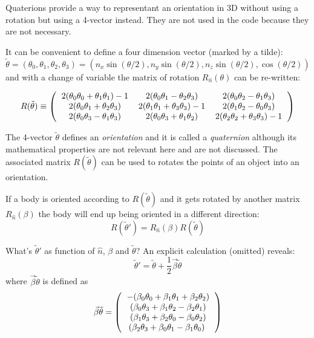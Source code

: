 \documentclass[12pt]{article}
\begin{document}
Quaterions provide a way to representant an orientation in 3D without using a rotation but using a 4-vector instead. They are not used in the code because they are not necessary.

It can be convenient to define a four dimension vector (marked by a tilde):
\begin{equation}
\tilde \theta = (\theta_0,\theta_1,\theta_2,\theta_3) = (n_x \sin(\theta/2), n_y \sin(\theta/2), n_z \sin(\theta/2),\cos(\theta/2))
\label{quaternion}
\end{equation}
and with a change of variable the matrix of rotation $R_{\hat n}(\theta)$ can be re-written:

\begin{equation}
R(\tilde \theta) \equiv \left(\begin{tabular}{ccc}
$2(\theta_0 \theta_0 + \theta_1 \theta_1)-1$ & $2(\theta_0 \theta_1 - \theta_2 \theta_3)$ & $2(\theta_0 \theta_2 - \theta_1 \theta_3) $\\
$2(\theta_0 \theta_1 + \theta_2 \theta_3)$ & $2(\theta_1 \theta_1 +\theta_3 \theta_3)-1$ & $2(\theta_1 \theta_2-\theta_0 \theta_3) $\\
$2(\theta_0 \theta_3 - \theta_1 \theta_3)$ & $2(\theta_0 \theta_3 + \theta_1 \theta_2)$ & $2(\theta_2 \theta_2 + \theta_3 \theta_3)-1$
\end{tabular}\right)
\label{rotation}
\end{equation}

The 4-vector $\tilde \theta$ defines an {\it orientation} and it is called a {\it quaternion} although its mathematical properties are not relevant here and are not discussed. The associated matrix $R(\tilde \theta)$ can be used to rotates the points of an object into an orientation.

If a body is oriented according to $R(\tilde \theta)$ and it gets rotated by another matrix $R_{\hat n}(\beta)$ the body will end up being oriented in a different direction:
\begin{equation}
R(\tilde \theta') = R_{\hat n}(\beta) R(\tilde \theta)
\end{equation}

What's  $\tilde \theta'$ as function of $\hat n$, $\beta$ and $\tilde \theta$?
An explicit calculation (omitted) reveals:
\begin{equation}
\tilde \theta' = \tilde \theta + \frac{1}{2}\vec \beta \tilde \theta
\label{theta_update}
\end{equation}
where $\vec \beta \tilde \theta$ is defined as 
\begin{equation}
\vec \beta \tilde \theta = \left(\begin{tabular}{c}
$- (\beta_0 \theta_0 + \beta_1 \theta_1 + \beta_2 \theta_2)$ \\
$(\beta_0 \theta_3 + \beta_1 \theta_2 - \beta_2 \theta_1)$ \\ 
$(\beta_1 \theta_3 + \beta_2 \theta_0 - \beta_0 \theta_2)$ \\ 
$(\beta_2 \theta_3 + \beta_0 \theta_1 - \beta_1 \theta_0)$ 
\label{vxq}
\end{tabular}\right)
\end{equation}
\end{document}
